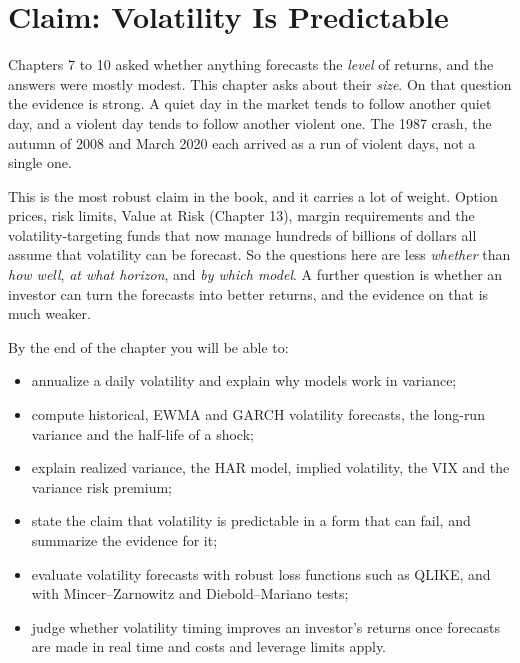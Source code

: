 \makeatletter
{}
\makeatother

\chapter{Claim: Volatility Is Predictable}
\label{ch:11}

Chapters 7 to 10 asked whether anything forecasts the \emph{level} of returns, and the answers were mostly modest. This chapter asks about their \emph{size}. On that question the evidence is strong. A quiet day in the market tends to follow another quiet day, and a violent day tends to follow another violent one. The 1987 crash, the autumn of 2008 and March 2020 each arrived as a run of violent days, not a single one.

This is the most robust claim in the book, and it carries a lot of weight. Option prices, risk limits, Value at Risk (Chapter 13), margin requirements and the volatility-targeting funds that now manage hundreds of billions of dollars all assume that volatility can be forecast. So the questions here are less \emph{whether} than \emph{how well}, \emph{at what horizon}, and \emph{by which model}. A further question is whether an investor can turn the forecasts into better returns, and the evidence on that is much weaker.

By the end of the chapter you will be able to:

\begin{itemize}
  \item annualize a daily volatility and explain why models work in variance;
  \item compute historical, EWMA and GARCH volatility forecasts, the long-run variance and the half-life of a shock;
  \item explain realized variance, the HAR model, implied volatility, the VIX and the variance risk premium;
  \item state the claim that volatility is predictable in a form that can fail, and summarize the evidence for it;
  \item evaluate volatility forecasts with robust loss functions such as QLIKE, and with Mincer--Zarnowitz and Diebold--Mariano tests;
  \item judge whether volatility timing improves an investor's returns once forecasts are made in real time and costs and leverage limits apply.
\end{itemize}

